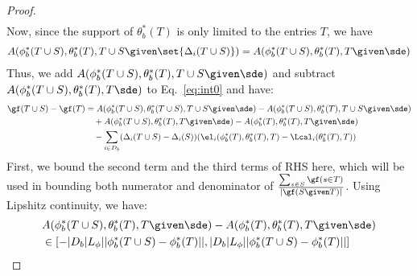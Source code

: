 \begin{proof}
\begin{align}
 \end{align}
Now, since the support of 
$ \theta^* _b (T)$ is only limited to the entries $T$, we have 
\begin{align}
A(\phi^* _b (T\cup S),  \theta^* _b (T), T\cup S \given \set{\Delta_i (T\cup S)})  = A(\phi^* _b (T\cup S),  \theta^* _b (T), T \given \sde) 
\end{align}
Thus, we add $A(\phi^* _b (T\cup S),  \theta^* _b (T), T\cup S \given \sde) $ and subtract  $A(\phi^* _b (T\cup S),  \theta^* _b (T), T \sde) $
to Eq.~\eqref{eq:int0} and have:
 \begin{align}
   \gf  (T\cup S) - \gf(T) &  =  A(\phi^* _b (T\cup S),  \theta^* _b (T\cup S), T\cup S \given \sde) - A(\phi^* _b (T\cup S),  \theta^* _b (T), T\cup S \given \sde)\nonumber \\
&\quad  +  A(\phi^* _b (T\cup S),  \theta^* _b (T), T \given \sde)  - A(\phi^* _b (T),  \theta^* _b (T), T \given \sde) \nonumber \\
  &\quad - \sum_{i\in D_b}(\Delta_i(T\cup S) - \Delta_i (S) ) ( \el_i(\phi_b ^*(T) , \theta_b ^*(T), T) - \Lcal_i (\theta _b ^*(T), T) ) \label{eq:EE}
\end{align}
%
First, we bound the second term and the third terms of RHS here, which will be used in bounding both numerator and denominator of $\frac{\sum_{s\in S} \gf(s\in T)}{|\gf(S\given T)|}$. Using Lipshitz continuity, we have:
\begin{align}
 &A(\phi^* _b (T\cup S),  \theta^* _b (T), T \given \sde)  - A(\phi^* _b (T),  \theta^* _b (T), T \given \sde) \nonumber\\
 & \in [-|D_b| L_{\phi} ||\phi^* _b (T\cup S) -\phi^* _b (T)||,|D_b| L_{\phi} ||\phi^* _b (T\cup S) -\phi^* _b (T)||] \nonumber \\

\end{align}
\end{proof}
